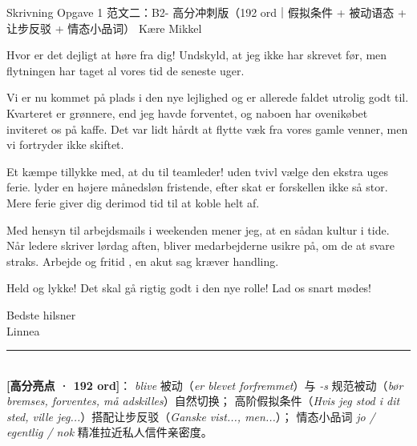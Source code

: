 \begin{emailbox}{Skrivning Opgave 1 范文二：B2- 高分冲刺版（192 ord｜假拟条件 + 被动语态 + 让步反驳 + 情态小品词）}
Kære Mikkel

\vspace{0.25em}
Hvor er det dejligt at høre fra dig! Undskyld, at jeg ikke har skrevet før, men flytningen har  taget al vores tid de seneste uger.

\vspace{0.25em}
Vi er nu kommet på plads i den nye lejlighed og er allerede faldet utrolig godt til. Kvarteret er grønnere, end jeg havde forventet, og naboen har ovenikøbet inviteret os på kaffe. Det var  lidt hårdt at flytte væk fra vores gamle venner, men vi fortryder ikke skiftet.

\vspace{0.25em}
Et kæmpe tillykke med, at du  til teamleder!  uden tvivl vælge den ekstra uges ferie.  lyder en højere månedsløn fristende,  efter skat er forskellen  ikke så stor. Mere ferie giver dig derimod tid til at koble helt af.

\vspace{0.25em}
Med hensyn til arbejdsmails i weekenden mener jeg, at en sådan kultur  i tide. Når ledere skriver lørdag aften, bliver medarbejderne usikre på, om de  at svare straks. Arbejde og fritid ,  en akut sag kræver handling.

\vspace{0.25em}
Held og lykke! Det skal  gå rigtig godt i den nye rolle! Lad os snart mødes!

\vspace{0.25em}
Bedste hilsner\\
Linnea

\vspace{0.3em}
\rule{\linewidth}{0.4pt}\\[0.2em]
\small\textbf{\color{NCDNavy}[高分亮点 · 192 ord]}： \textit{blive} 被动（\textit{er blevet forfremmet}）与 \textit{-s} 规范被动（\textit{bør bremses, forventes, må adskilles}）自然切换； 高阶假拟条件（\textit{Hvis jeg stod i dit sted, ville jeg...}）搭配让步反驳（\textit{Ganske vist..., men...}）； 情态小品词 \textit{jo / egentlig / nok} 精准拉近私人信件亲密度。
\end{emailbox}

